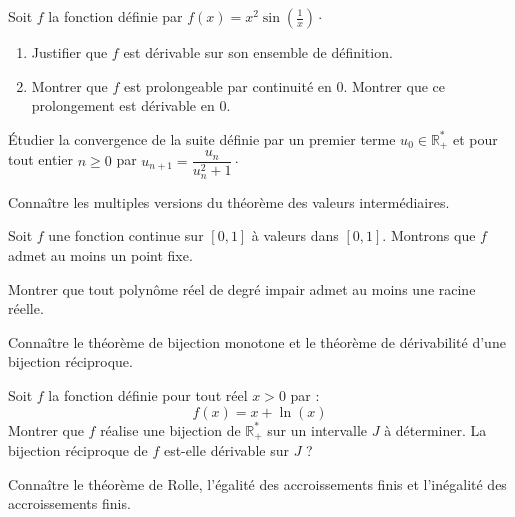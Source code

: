 \documentclass[a4paper,twoside,french,11pt]{VcCours}
\begin{document}
\begin{Exercice}{}
  Soit $f$ la fonction définie par $f(x) = x^2 \sin \left( \frac{1}{x} \right) \cdot$

  \begin{enumerate}
    \item Justifier que $f$ est dérivable sur son ensemble de définition.
    \item Montrer que $f$ est prolongeable par continuité en $0$. Montrer que ce prolongement est dérivable en $0$.
  \end{enumerate}
\end{Exercice} 

\begin{Exercice}{}
  Étudier la convergence de la suite définie par un premier terme $u_0 \in \mathbb{R}_+^*$ et pour tout entier $n \geq 0$ par $u_{n+1} = \dfrac{u_n}{u_n^2+1} \cdot$
\end{Exercice} 

\begin{ptc}{}
	Connaître les multiples versions du théorème des valeurs intermédiaires.
\end{ptc}

\begin{Exercice}{}
  Soit $f$ une fonction continue sur $[0,1]$ à valeurs dans $[0,1]$. Montrons que $f$ admet au moins un point fixe.
\end{Exercice} 

\begin{Exercice}{}
  Montrer que tout polynôme réel de degré impair admet au moins une racine réelle.
\end{Exercice} 

\begin{ptc}{}
	Connaître le théorème de bijection monotone et le théorème de dérivabilité d'une bijection réciproque.
\end{ptc}

\begin{Exercice}{}
  Soit $f$ la fonction définie pour tout réel $x>0$ par :
  $$ f(x)= x+ \ln(x)$$
  Montrer que $f$ réalise une bijection de $\mathbb{R}_+^{*}$ sur un intervalle $J$ à déterminer. La bijection réciproque de $f$ est-elle dérivable sur $J$ ?
\end{Exercice} 

\begin{ptc}{}
	Connaître le théorème de Rolle, l'égalité des accroissements finis et l'inégalité des accroissements finis.
\end{ptc}
\end{document}

